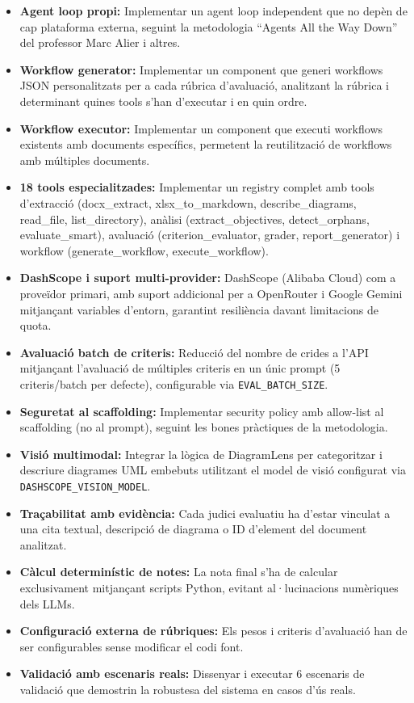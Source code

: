 \documentclass[12pt,a4paper,twoside]{report}
\begin{document}
\begin{itemize}
    \item \textbf{Agent loop propi:} Implementar un agent loop independent que no dep\`en de cap plataforma externa, seguint la metodologia ``Agents All the Way Down'' del professor Marc Alier i altres.
    \item \textbf{Workflow generator:} Implementar un component que generi workflows JSON personalitzats per a cada r\'ubrica d'avaluaci\'o, analitzant la r\'ubrica i determinant quines tools s'han d'executar i en quin ordre.
    \item \textbf{Workflow executor:} Implementar un component que executi workflows existents amb documents espec\'ifics, permetent la reutilitzaci\'o de workflows amb m\'ultiples documents.
    \item \textbf{18 tools especialitzades:} Implementar un registry complet amb tools d'extracci\'o (docx\_extract, xlsx\_to\_markdown, describe\_diagrams, read\_file, list\_directory), an\`alisi (extract\_objectives, detect\_orphans, evaluate\_smart), avaluaci\'o (criterion\_evaluator, grader, report\_generator) i workflow (generate\_workflow, execute\_workflow).
    \item \textbf{DashScope i suport multi-provider:} DashScope (Alibaba Cloud) com a prove\"idor primari, amb suport addicional per a OpenRouter i Google Gemini mitjan\c{c}ant variables d'entorn, garantint resili\`encia davant limitacions de quota.
    \item \textbf{Avaluaci\'o batch de criteris:} Reducci\'o del nombre de crides a l'API mitjan\c{c}ant l'avaluaci\'o de m\'ultiples criteris en un \'unic prompt (5 criteris/batch per defecte), configurable via \texttt{EVAL\_BATCH\_SIZE}.
    \item \textbf{Seguretat al scaffolding:} Implementar security policy amb allow-list al scaffolding (no al prompt), seguint les bones pr\`actiques de la metodologia.
    \item \textbf{Visi\'o multimodal:} Integrar la l\`ogica de DiagramLens per categoritzar i descriure diagrames UML embebuts utilitzant el model de visi\'o configurat via \texttt{DASHSCOPE\_VISION\_MODEL}.
    \item \textbf{Tra\c{c}abilitat amb evid\`encia:} Cada judici evaluatiu ha d'estar vinculat a una cita textual, descripci\'o de diagrama o ID d'element del document analitzat.
    \item \textbf{C\`alcul determin\'istic de notes:} La nota final s'ha de calcular exclusivament mitjan\c{c}ant scripts Python, evitant al·lucinacions num\`eriques dels LLMs.
    \item \textbf{Configuraci\'o externa de r\'ubriques:} Els pesos i criteris d'avaluaci\'o han de ser configurables sense modificar el codi font.
    \item \textbf{Validaci\'o amb escenaris reals:} Dissenyar i executar 6 escenaris de validaci\'o que demostrin la robustesa del sistema en casos d'\'us reals.
\end{itemize}
\end{document}

